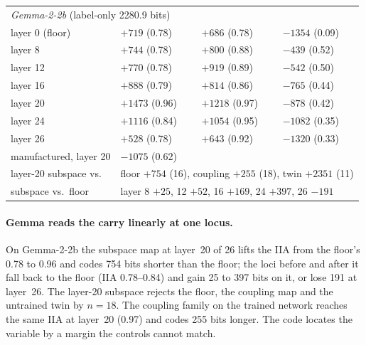 \documentclass[11pt,a4paper]{article}
\begin{document}
\begin{table}[htbp]
\begin{tabular}{llll}
\midrule
\multicolumn{4}{l}{\emph{Gemma-2-2b} (label-only 2280.9 bits)}\\
layer 0 (floor) & $+719$ (0.78) & $+686$ (0.78) & $-1354$ (0.09)\\
layer 8 & $+744$ (0.78) & $+800$ (0.88) & $-439$ (0.52)\\
layer 12 & $+770$ (0.78) & $+919$ (0.89) & $-542$ (0.50)\\
layer 16 & $+888$ (0.79) & $+814$ (0.86) & $-765$ (0.44)\\
layer 20 & $+1473$ (0.96) & $+1218$ (0.97) & $-878$ (0.42)\\
layer 24 & $+1116$ (0.84) & $+1054$ (0.95) & $-1082$ (0.35)\\
layer 26 & $+528$ (0.78) & $+643$ (0.92) & $-1320$ (0.33)\\
manufactured, layer 20 & \multicolumn{3}{l}{$-1075$ (0.62)}\\
layer-20 subspace vs.\ & \multicolumn{3}{l}{floor $+754$ (16), coupling $+255$ (18), twin $+2351$ (11)}\\
subspace vs.\ floor & \multicolumn{3}{l}{layer 8 $+25$, 12 $+52$, 16 $+169$, 24 $+397$, 26 $-191$}\\
\bottomrule
\end{tabular}
\end{table}

\paragraph{Gemma reads the carry linearly at one locus.} On Gemma-2-2b the subspace map at layer~20 of 26 lifts the IIA from the floor's 0.78 to 0.96 and codes 754 bits shorter than the floor; the loci before and after it fall back to the floor (IIA 0.78--0.84) and gain 25 to 397 bits on it, or lose 191 at layer~26. The layer-20 subspace rejects the floor, the coupling map and the untrained twin by $n=18$. The coupling family on the trained network reaches the same IIA at layer~20 (0.97) and codes 255 bits longer. The code locates the variable by a margin the controls cannot match.
\end{document}
